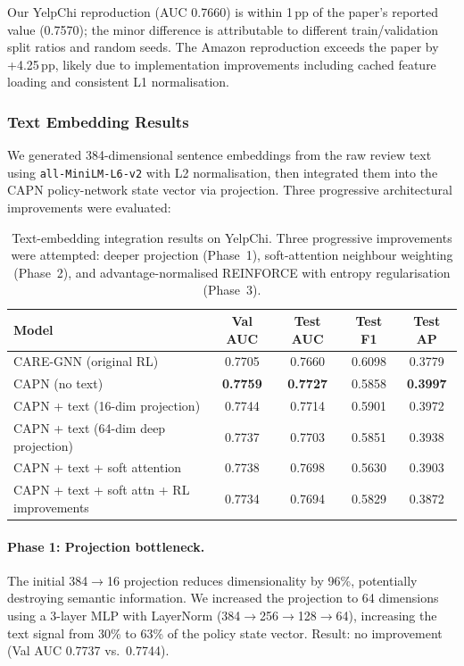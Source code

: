 \noindent
Our YelpChi reproduction (AUC 0.7660) is within 1\,pp of the paper's reported value (0.7570); the minor difference is attributable to different train/validation split ratios and random seeds. The Amazon reproduction exceeds the paper by +4.25\,pp, likely due to implementation improvements including cached feature loading and consistent L1 normalisation.

\subsubsection{Text Embedding Results}

We generated 384-dimensional sentence embeddings from the raw review text using \texttt{all-MiniLM-L6-v2} with L2 normalisation, then integrated them into the CAPN policy-network state vector via projection. Three progressive architectural improvements were evaluated:

\begin{table}[h!]
\centering
\begin{tabular}{lcccc}
\toprule
\textbf{Model} & \textbf{Val AUC} & \textbf{Test AUC} & \textbf{Test F1} & \textbf{Test AP} \\
\midrule
CARE-GNN (original RL)                     & 0.7705 & 0.7660 & 0.6098 & 0.3779 \\
CAPN (no text)                             & \textbf{0.7759} & \textbf{0.7727} & 0.5858 & \textbf{0.3997} \\
\midrule
CAPN + text (16-dim projection)            & 0.7744 & 0.7714 & 0.5901 & 0.3972 \\
CAPN + text (64-dim deep projection)       & 0.7737 & 0.7703 & 0.5851 & 0.3938 \\
CAPN + text + soft attention               & 0.7738 & 0.7698 & 0.5630 & 0.3903 \\
CAPN + text + soft attn + RL improvements  & 0.7734 & 0.7694 & 0.5829 & 0.3872 \\
\bottomrule
\end{tabular}
\caption{Text-embedding integration results on YelpChi. Three progressive improvements were attempted: deeper projection (Phase~1), soft-attention neighbour weighting (Phase~2), and advantage-normalised REINFORCE with entropy regularisation (Phase~3).}
\label{tab:yelp-text-results}
\end{table}

\paragraph{Phase 1: Projection bottleneck.}
The initial 384$\to$16 projection reduces dimensionality by 96\%, potentially destroying semantic information. We increased the projection to 64 dimensions using a 3-layer MLP with LayerNorm (384$\to$256$\to$128$\to$64), increasing the text signal from 30\% to 63\% of the policy state vector. Result: no improvement (Val AUC 0.7737 vs.\ 0.7744).


